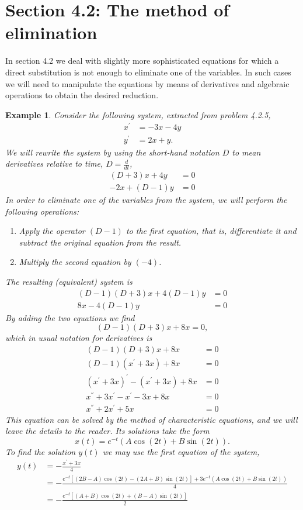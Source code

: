 \documentclass[11pt]{amsart}
\newtheorem{example}{Example}
\numberwithin{equation}{section}
\begin{document}
\section*{Section 4.2: The method of elimination}
In section 4.2 we deal with slightly more sophisticated equations for which a direct substitution is not enough to eliminate one of the variables. In such cases we will need to manipulate the equations by means of derivatives and algebraic operations to obtain the desired reduction. 
\begin{example}
Consider the following system, extracted from problem 4.2.5, 
\begin{align*}
x^{'} & = -3x-4y \\
y^{'} & = 2x+y.
\end{align*}
We will rewrite the system by using the short-hand notation $D$ to mean derivatives relative to time, $D=\frac{d}{dt}$, 
\begin{align*}
(D+3)x+4y & = 0\\
-2x + (D-1)y & = 0
\end{align*}
In order to eliminate one of the variables from the system, we will perform the following operations:
\begin{enumerate}
\item Apply the operator $(D-1)$ to the first equation, that is, differentiate it and subtract the original equation from the result.
\item Multiply the second equation by $(-4)$. 
\end{enumerate}
The resulting (equivalent) system is 
\begin{align*}
(D-1)(D+3)x+4(D-1)y & = 0\\
8x -4 (D-1)y & = 0
\end{align*}
By adding the two equations we find
\begin{equation*}
(D-1)(D+3)x + 8x =0,
\end{equation*}
which in usual notation for derivatives is 
\begin{align*}
(D-1)(D+3)x + 8x & =0\\
(D-1)(x^{'}+3x)+8x & = 0\\
(x^{'}+3x)^{'}-(x^{'}+3x)+8x & = 0\\
x^{''}+3x^{'}-x^{'}-3x+8x & = 0\\
x^{''}+2x^{'}+5x & = 0
\end{align*}
This equation can be solved by the method of characteristic equations, and we will leave the details to the reader. Its solutions take the form
\begin{equation*}
x(t)=e^{-t}(A\cos(2t)+B\sin(2t)).
\end{equation*}
To find the solution $y(t)$ we may use the first equation of the system,
\begin{align*}
y(t) & = -\frac{x^{'} +3x}{4} \\
& =-\frac{e^{-t}[(2B-A)\cos(2t) -(2A+B)\sin(2t)]+3e^{-t}(A\cos(2t)+B\sin(2t))}{4} \\
& = -\frac{e^{-t}[(A+B)\cos(2t)+(B-A)\sin(2t)]}{2}
\end{align*}
\end{example}
\end{document}
